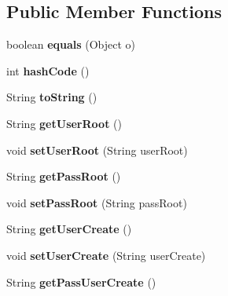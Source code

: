\subsection*{Public Member Functions}
\begin{DoxyCompactItemize}
\item 
\mbox{\label{class_create_user_root_ad00b10c9a8ea120dbef823e1cbf2961d}} 
boolean {\bfseries equals} (Object o)
\item 
\mbox{\label{class_create_user_root_a20b56a7302f659762a408ee77f94ce7f}} 
int {\bfseries hash\+Code} ()
\item 
\mbox{\label{class_create_user_root_a162c5272b7e633c81aca4077088eeccb}} 
String {\bfseries to\+String} ()
\item 
\mbox{\label{class_create_user_root_ad3a6203b1afee594d5e0214b721bbabd}} 
String {\bfseries get\+User\+Root} ()
\item 
\mbox{\label{class_create_user_root_a1ef78fab3a8f64515e47e133a5e40a00}} 
void {\bfseries set\+User\+Root} (String user\+Root)
\item 
\mbox{\label{class_create_user_root_a2e2dd9b254a65fad94d21b811a3dbd55}} 
String {\bfseries get\+Pass\+Root} ()
\item 
\mbox{\label{class_create_user_root_a1ec9f4160b07eb21578fc405a5e9fca2}} 
void {\bfseries set\+Pass\+Root} (String pass\+Root)
\item 
\mbox{\label{class_create_user_root_a3bf1bdb585e44c54f6bb40dd08bd54bf}} 
String {\bfseries get\+User\+Create} ()
\item 
\mbox{\label{class_create_user_root_a288697775d0b4d8e61d15e587d007c6c}} 
void {\bfseries set\+User\+Create} (String user\+Create)
\item 
\mbox{\label{class_create_user_root_a2706b425eeb1642e2b3e3dce74909e1a}} 
String {\bfseries get\+Pass\+User\+Create} ()
\item 

\end{DoxyCompactItemize}

